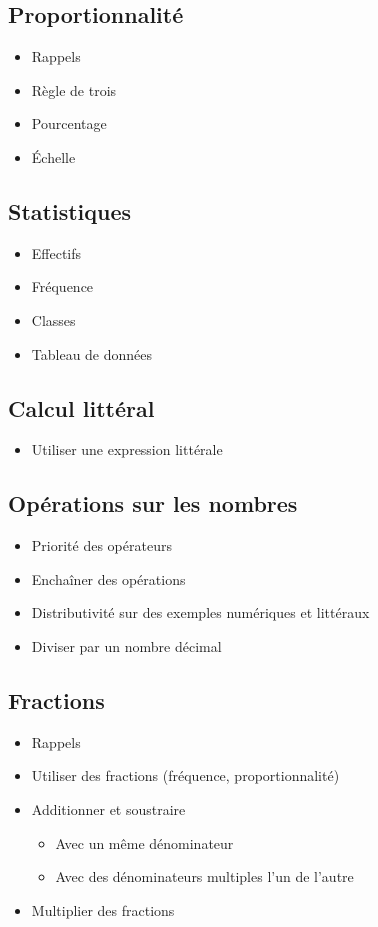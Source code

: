 \subsection{Proportionnalité}
\begin{itemize}
	\item Rappels
	\item Règle de trois
	\item Pourcentage
	\item \'Echelle
\end{itemize}

\subsection{Statistiques}
\begin{itemize}
	\item Effectifs
	\item Fréquence
	\item Classes
	\item Tableau de données
\end{itemize}

\subsection{Calcul littéral}
\begin{itemize}
	\item Utiliser une expression littérale
\end{itemize}

\subsection{Opérations sur les nombres}

\begin{itemize}
	\item Priorité des opérateurs
	\item Enchaîner des opérations
	\item Distributivité sur des exemples numériques et littéraux
	\item Diviser par un nombre décimal
\end{itemize}

\subsection{Fractions}
\begin{itemize}
	\item Rappels
	\item Utiliser des fractions (fréquence, proportionnalité)
	\item Additionner et soustraire
		\begin{itemize}
			\item Avec un même dénominateur
			\item Avec des dénominateurs multiples l'un de l'autre
		\end{itemize}
	\item Multiplier des fractions
\end{itemize}

